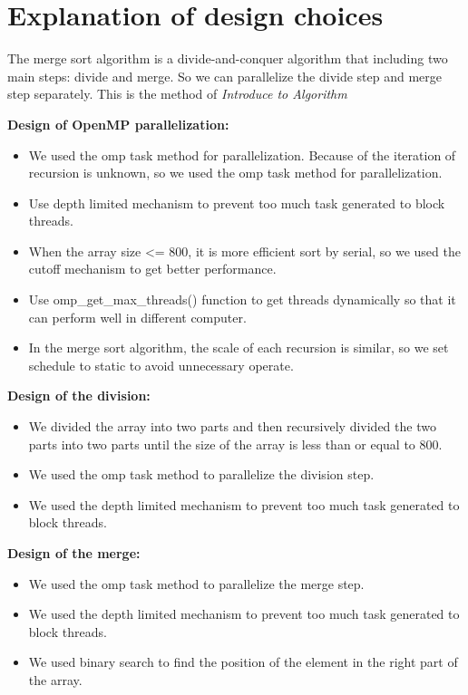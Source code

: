 \documentclass[a4paper,12pt]{report}
\begin{document}
\section*{Explanation of design choices}
The merge sort algorithm is a divide-and-conquer algorithm that including two main steps: divide and merge. So we can parallelize the divide step and merge step separately. This is the method of \textit{Introduce to Algorithm}\cite{cormen2001introduction}

\noindent\textbf{Design of OpenMP parallelization:}
\begin{itemize}
    \item We used the omp task method for parallelization. Because of the iteration of recursion is unknown, so we used the omp task method for parallelization.
    \item Use depth limited mechanism to prevent too much task generated to block threads.
    \item When the array size <= 800, it is more efficient sort by serial, so we used the cutoff mechanism to get better performance.
    \item Use omp\_get\_max\_threads() function to get threads dynamically so that it can perform well in different computer.
    \item In the merge sort algorithm, the scale of each recursion is similar, so we set schedule to static to avoid unnecessary operate.
\end{itemize}

\noindent\textbf{Design of the division:}
\begin{itemize}
    \item We divided the array into two parts and then recursively divided the two parts into two parts until the size of the array is less than or equal to 800.
    \item We used the omp task method to parallelize the division step.
    \item We used the depth limited mechanism to prevent too much task generated to block threads.
\end{itemize}

\noindent\textbf{Design of the merge:}
\begin{itemize}
    \item We used the omp task method to parallelize the merge step.
    \item We used the depth limited mechanism to prevent too much task generated to block threads.
    \item We used binary search to find the position of the element in the right part of the array.
\end{itemize}


\end{document}
